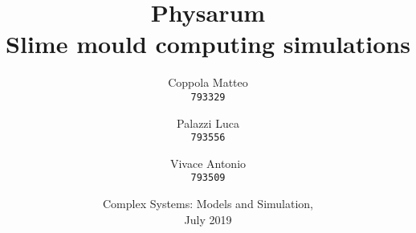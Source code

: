 \documentclass{report}
\begin{document}
\title{%
  \Huge Physarum\\
  \large Slime mould computing simulations\\
    }
\author{
  Coppola Matteo\\
  \texttt{793329}
  \and
  Palazzi Luca\\
  \texttt{793556}
   \and
  Vivace Antonio\\
  \texttt{793509}
}
\date{Complex Systems: Models and Simulation, \\ July 2019}
\maketitle
\end{document}
